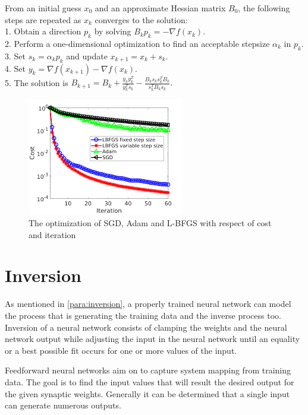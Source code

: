 \noindent From an initial guess $x_0$ and an approximate Hessian matrix $B_0$, the following steps are repeated as $x_k$ converges to the solution:\\
1. Obtain a direction $p_k$ by solving $B_k p_k = - \nabla f(x_k). $ \\
2. Perform a one-dimensional optimization to find an acceptable stepsize $\alpha_k$ in $p_k$. \\
3. Set $s_k = \alpha_k p_k$ and update $x_{k+1} = x_k + s_k.$ \\
4. Set $y_k = \nabla f(x_{k+1}) - \nabla f(x_k).$ \\ 
5. The solution is $B_{k+1} = B_k + \frac{y_k y^T_k}{y^T_k s_k} - \frac{B_k s_k s^T_k B_k}{s^T_k B_k s_k}.$

\begin{figure}[h]
	\centering
	\includegraphics[height=0.34\linewidth]{./figures/optimization}
	\caption{The optimization of SGD, Adam and L-BFGS with respect of cost and iteration}
	\label{fig:optimization}
\end{figure}





\section{Inversion}

As mentioned in \autoref{para:inversion}, a properly trained neural network can model the process that is generating the training data and the inverse process too. Inversion of a neural network consists of clamping the weights and the neural network output while adjusting the input in the neural network until an equality or a best possible fit occurs for one or more values of the input. \medskip

Feedforward neural networks aim on to capture system mapping from training data. The goal is to find the input values that will result the desired output for the given synaptic weights. Generally it can be determined that a single input can generate numerous outputs. \smallskip

